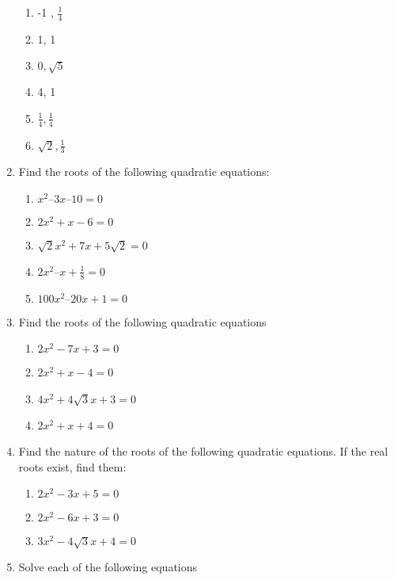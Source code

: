 \begin{enumerate}[label=\arabic*.,ref=\thesubsection.\theenumi]
\begin{enumerate}
\item-1 , $\frac{1}{ 4}$
\item 1, 1
\item $0, \sqrt{5}$ 
\item 4, 1
 \item $\frac{1}{4}, \frac{1}{4}$
\item  $\sqrt{2}, \frac{1}{ 3}$
\end{enumerate}
\item Find the roots of the following quadratic equations:
\begin{enumerate}
\item $x^2 – 3x – 10=0$
\item $2x^2+x-6=0$
\item $\sqrt{2}x^2 +7x+5\sqrt{2}  = 0$
\item $2x^2– x +\frac{1}{8} = 0 $
\item $100x^2 – 20x +1 = 0$
\end{enumerate}
\item Find the roots of the following quadratic equations
\begin{enumerate}
\item 	$2x^2-7x+3 = 0$
\item 	2$x^2+x-4 = 0$
\item 	$4x^2+4\sqrt{3}x+3 = 0$
\item 	2$x^2+x+4 = 0$
\end{enumerate}
\item Find the nature of the roots of the following quadratic equations. If the real roots exist, find them:
\begin{enumerate}
\item 	$2x^2-3x+5 = 0$
\item 	$2x^2-6x+3 = 0$
\item 	$3x^2-4\sqrt{3}x+4 = 0$
\end{enumerate}
\item Solve each of the following equations

\end{enumerate}
